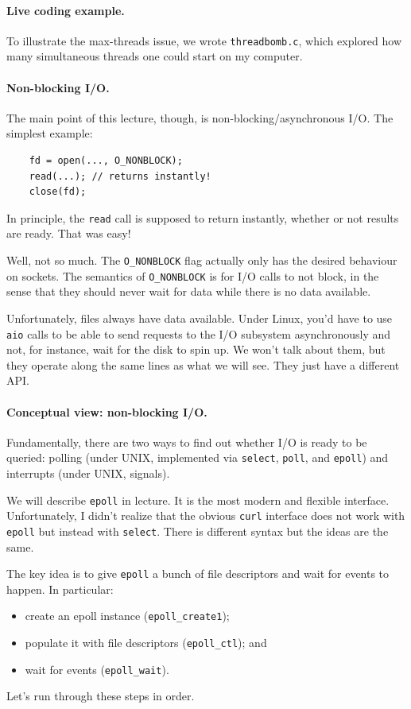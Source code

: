 \documentclass[11pt]{article}
\begin{document}
\paragraph{Live coding example.} To illustrate the max-threads
issue, we wrote {\tt threadbomb.c}, which explored how many simultaneous threads
one could start on my computer.

\paragraph{Non-blocking I/O.} The main point of this lecture, though,
is non-blocking/asynchronous I/O. The simplest example:

\begin{lstlisting}
    fd = open(..., O_NONBLOCK);
    read(...); // returns instantly!
    close(fd);
\end{lstlisting}

In principle, the {\tt read} call is supposed to return instantly,
whether or not results are ready. That was easy!

Well, not so much. The {\tt O\_NONBLOCK} flag actually only has the
desired behaviour on sockets. The semantics of {\tt O\_NONBLOCK} is
for I/O calls to not block, in the sense that they should never wait
for data while there is no data available.

Unfortunately, files always have data available. Under Linux, you'd have
to use {\tt aio} calls to be able to send requests to the I/O subsystem
asynchronously and not, for instance, wait for the disk to spin up.
We won't talk about them, but they operate along the same lines as what
we will see. They just have a different API.

\paragraph{Conceptual view: non-blocking I/O.} Fundamentally,
there are two ways to find out whether I/O is ready to be queried:
polling (under UNIX, implemented via {\tt select}, {\tt poll},
and {\tt epoll}) and interrupts (under UNIX, signals).

We will describe {\tt epoll} in lecture. It is the most modern and
flexible interface. Unfortunately, I didn't realize that the obvious
{\tt curl} interface does not work with {\tt epoll} but instead with
{\tt select}.  There is different syntax but the ideas are the same.

The key idea is to give {\tt epoll} a bunch of file descriptors and
wait for events to happen. In particular:
     \begin{itemize}
       \item create an epoll instance ({\tt epoll\_create1});
       \item populate it with file descriptors ({\tt epoll\_ctl}); and
       \item wait for events ({\tt epoll\_wait}).
     \end{itemize}
Let's run through these steps in order.
\end{document}
